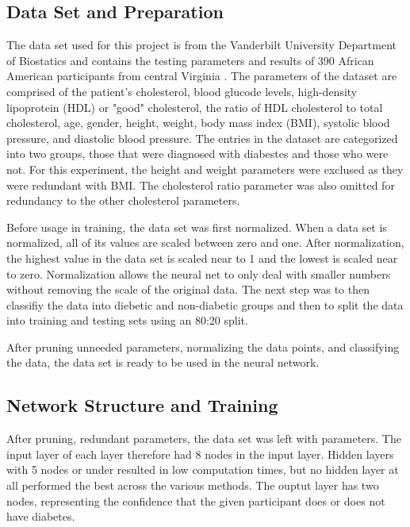 \documentclass[12pt]{article}
\begin{document}
    \subsection{Data Set and Preparation}
        The data set used for this project is from the Vanderbilt University Department of Biostatics and contains
        the testing parameters and results of 390 African American participants from central Virginia \cite{diabetesData}.
        The parameters of the dataset are comprised of the patient's cholesterol, blood glucode levels, high-density lipoprotein (HDL)
        or "good" cholesterol, the ratio of HDL cholesterol to total cholesterol, age, gender, height, weight, body mass index (BMI),
        systolic blood pressure, and diastolic blood pressure.  The entries in the dataset are categorized into two groups, those that
        were diagnosed with diabestes and those who were not.  For this experiment, the height and weight parameters were exclused
        as they were redundant with BMI.  The cholesterol ratio parameter was also omitted for redundancy to the other cholesterol parameters.

        Before usage in training, the data set was first normalized.  When a data set is normalized, all of its values are scaled
        between zero and one.  After normalization, the highest value in the data set is scaled near to 1 and the lowest is scaled near to zero.
        Normalization allows the neural net to only deal with smaller numbers without removing  the scale of the original data.
        The next step was to then classifiy the data into diebetic and non-diabetic groups and then to split the data into training and
        testing sets using an 80:20 split.

        After pruning unneeded parameters, normalizing the data points, and classifying the data, the data set is ready to be used in the neural network.
    \subsection{Network Structure and Training}
        After pruning, redundant parameters, the data set was left with parameters.  The input layer of each layer therefore had 8 nodes in the
        input layer.  Hidden layers with 5 nodes or under resulted in low computation times, but no hidden layer at all performed the best across the various methods.
        The ouptut layer has two nodes, representing the confidence that the given participant does or does not have diabetes.
\end{document}
